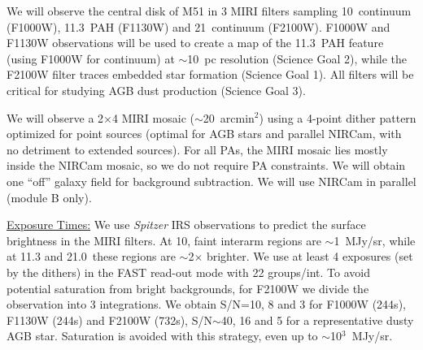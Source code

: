 \documentclass[12pt]{article}
\begin{document}



  We will observe the central disk of M51 in 3 MIRI filters sampling  10\micron\ continuum (F1000W), 11.3\micron\ PAH (F1130W) and 21\micron\ continuum (F2100W).  F1000W and F1130W observations will be used to create a map of the 11.3\micron\ PAH feature (using F1000W for continuum) at $\sim$10~pc resolution (Science Goal 2), while the F2100W filter traces embedded star formation (Science Goal 1). All filters will be critical for studying AGB dust production (Science Goal 3).

We will observe a 2$\times$4 MIRI mosaic ($\sim$20~arcmin$^2$) using a 4-point dither pattern optimized for point sources (optimal for AGB stars and parallel NIRCam, with no detriment to extended sources). For all PAs, the MIRI mosaic lies mostly inside the NIRCam mosaic, so we do not require PA constraints. We will obtain one ``off'' galaxy field for background subtraction. We will use NIRCam in parallel (module B only).

\vspace{0.05in}

\noindent \underline{Exposure Times:} We use {\em Spitzer} IRS observations to predict the surface brightness in the MIRI filters. At 10\micron, faint interarm regions are $\sim$1~MJy/sr, while at 11.3 and 21.0\micron\ these regions are $\sim$2$\times$ brighter.  We use at least 4 exposures (set by the dithers) in the FAST read-out mode with 22 groups/int. To avoid potential saturation from bright backgrounds, for F2100W we divide the observation into 3 integrations. We obtain S/N=10, 8 and 3 for F1000W (244s), F1130W (244s) and F2100W (732s), S/N$\sim$40, 16 and 5 for a representative dusty AGB star.  Saturation is avoided with this strategy, even up to $\sim$10$^3$~MJy/sr.
\end{document}
